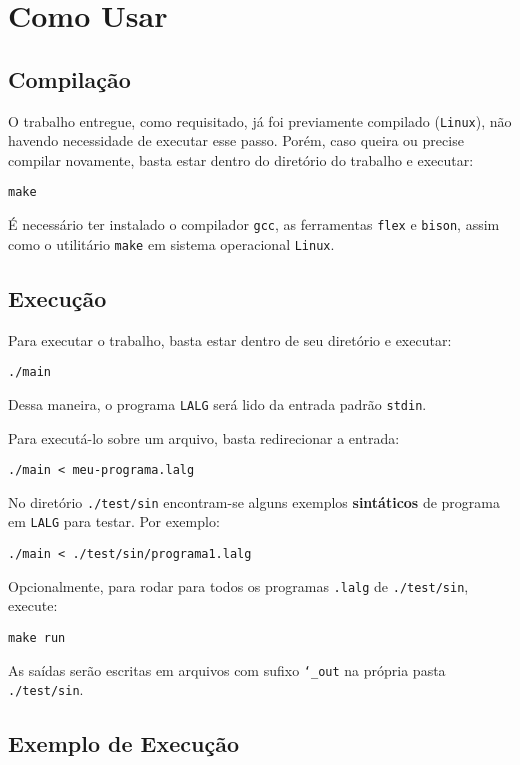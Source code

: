 \section{Como Usar \label{sec:como-usar}}

\subsection{Compilação}

O trabalho entregue, como requisitado, já foi previamente compilado (\texttt{Linux}), não havendo necessidade de executar esse passo. Porém, caso queira ou precise compilar novamente, basta estar dentro do diretório do trabalho e executar:

	\indent\indent\texttt{make}

É necessário ter instalado o compilador \texttt{gcc}, as ferramentas \texttt{flex} e \texttt{bison}, assim como o utilitário \texttt{make} em sistema operacional \texttt{Linux}.

\subsection{Execução}

Para executar o trabalho, basta estar dentro de seu diretório e executar:

	\indent\indent\texttt{./main}

Dessa maneira, o programa \texttt{LALG} será lido da entrada padrão \texttt{stdin}.

Para executá-lo sobre um arquivo, basta redirecionar a entrada:

	\indent\indent\texttt{./main < meu-programa.lalg}

No diretório \texttt{./test/sin} encontram-se alguns exemplos \textbf{sintáticos} de programa em \texttt{LALG} para testar. Por exemplo:

	\indent\indent\texttt{./main < ./test/sin/programa1.lalg}

Opcionalmente, para rodar para todos os programas \texttt{.lalg} de \texttt{./test/sin}, execute:

	\indent\indent\texttt{make run}

As saídas serão escritas em arquivos com sufixo \texttt{\char`_out} na própria pasta \texttt{./test/sin}.

\newpage
\subsection{Exemplo de Execução}

